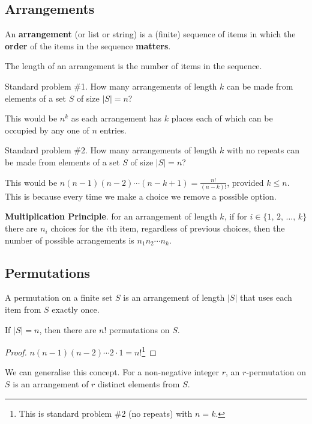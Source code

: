 \documentclass[10pt, a4paper]{article}
\begin{document}
\subsection{Arrangements}
\begin{definition}[Arrangement]
    An \textbf{arrangement} (or list or string) is a (finite) sequence of items in which the \textbf{order} of the items in the sequence \textbf{matters}.
\end{definition}

The length of an arrangement is the number of items in the sequence.

Standard problem \#1.
How many arrangements of length $k$ can be made from elements of a set $S$ of size $|S| = n$?

This would be $n ^ k$ as each arrangement has $k$ places each of which can be occupied by any one of $n$ entries.


Standard problem \#2.
How many arrangements of length $k$ with no repeats can be made from elements of a set $S$ of size $|S| = n$?

This would be $n(n - 1)(n - 2)\dotsi(n - k + 1) = \frac{n!}{(n - k)!}$,
provided $k \leq n$.
This is because every time we make a choice we remove a possible option.


\textbf{Multiplication Principle}. for an arrangement of length $k$, if for $i \in \{1,\,2,\,\dotsc,\,k\}$ there are $n_i$ choices for the $i$th item, regardless of previous choices, then the number of possible arrangements is $n_1n_2\dotsi n_k$.

\subsection{Permutations}
\begin{definition}[Permutation]
    A permutation on a finite set $S$ is an arrangement of length $|S|$ that uses each item from $S$ exactly once.
\end{definition}

\begin{proposition}
    If $|S| = n$, then there are $n!$ permutations on $S$.
    
    \begin{proof}
        $n(n - 1)(n - 2)\dotsi 2 \cdot 1 = n!$\footnote{This is standard problem \#2 (no repeats) with $n = k$.}
    \end{proof}
\end{proposition}

We can generalise this concept. For a non-negative integer $r$, an $r$-permutation on $S$ is an arrangement of $r$ distinct elements from $S$.
\end{document}
